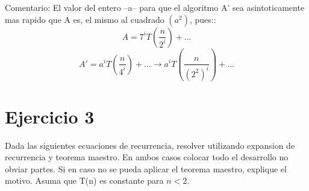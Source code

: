 \documentclass[10pt,a4paper]{article}
\begin{document}
	Comentario: El valor del entero --a-- para que el algoritmo A' sea asintoticamente mas rapido que A es, el mismo al cuadrado $(a^{2})$, pues::
	\begin{equation*}
		A = 7^{i}T(\frac{n}{2^{i}})+... 
	\end{equation*}
	\begin{equation*}
		A' = a^{i}T(\frac{n}{4^{i}})+ ... \rightarrow a^{i}T(\frac{n}{(2^{2})^{i}})+ ... 
	\end{equation*}
\section{Ejercicio 3}
	Dada las siguientes ecuaciones de recurrencia, resolver utilizando expansion de recurrencia y teorema maestro. En ambos casos colocar todo el desarrollo no obviar partes. Si en caso no se pueda aplicar el teorema maestro, explique el motivo. Asuma que T(n) es constante para $n < 2$.
\end{document}
